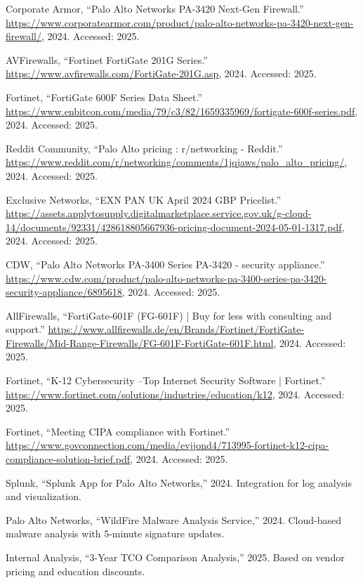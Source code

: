 \documentclass[12pt]{article}
\begin{document}
\begin{thebibliography}{10}
{Corporate Armor}, ``{Palo Alto Networks PA-3420 Next-Gen Firewall}.''
  \url{https://www.corporatearmor.com/product/palo-alto-networks-pa-3420-next-gen-firewall/},
  2024.
\newblock Accessed: 2025.

{AVFirewalls}, ``{Fortinet FortiGate 201G Series}.''
  \url{https://www.avfirewalls.com/FortiGate-201G.asp}, 2024.
\newblock Accessed: 2025.

{Fortinet}, ``{FortiGate 600F Series Data Sheet}.''
  \url{https://www.enbitcon.com/media/79/c3/82/1659335969/fortigate-600f-series.pdf},
  2024.
\newblock Accessed: 2025.

{Reddit Community}, ``{Palo Alto pricing : r/networking - Reddit}.''
  \url{https://www.reddit.com/r/networking/comments/1jqjaws/palo_alto_pricing/},
  2024.
\newblock Accessed: 2025.

{Exclusive Networks}, ``{EXN PAN UK April 2024 GBP Pricelist}.''
  \url{https://assets.applytosupply.digitalmarketplace.service.gov.uk/g-cloud-14/documents/92331/428618805667936-pricing-document-2024-05-01-1317.pdf},
  2024.
\newblock Accessed: 2025.

{CDW}, ``{Palo Alto Networks PA-3400 Series PA-3420 - security appliance}.''
  \url{https://www.cdw.com/product/palo-alto-networks-pa-3400-series-pa-3420-security-appliance/6895618},
  2024.
\newblock Accessed: 2025.

{AllFirewalls}, ``{FortiGate-601F (FG-601F) | Buy for less with consulting and
  support}.''
  \url{https://www.allfirewalls.de/en/Brands/Fortinet/FortiGate-Firewalls/Mid-Range-Firewalls/FG-601F-FortiGate-601F.html},
  2024.
\newblock Accessed: 2025.

{Fortinet}, ``{K-12 Cybersecurity –Top Internet Security Software |
  Fortinet}.''
  \url{https://www.fortinet.com/solutions/industries/education/k12}, 2024.
\newblock Accessed: 2025.

{Fortinet}, ``{Meeting CIPA compliance with Fortinet}.''
  \url{https://www.govconnection.com/media/evjjond4/713995-fortinet-k12-cipa-compliance-solution-brief.pdf},
  2024.
\newblock Accessed: 2025.

{Splunk}, ``{Splunk App for Palo Alto Networks},'' 2024.
\newblock Integration for log analysis and visualization.

{Palo Alto Networks}, ``{WildFire Malware Analysis Service},'' 2024.
\newblock Cloud-based malware analysis with 5-minute signature updates.

{Internal Analysis}, ``{3-Year TCO Comparison Analysis},'' 2025.
\newblock Based on vendor pricing and education discounts.

\end{thebibliography}
\end{document}
